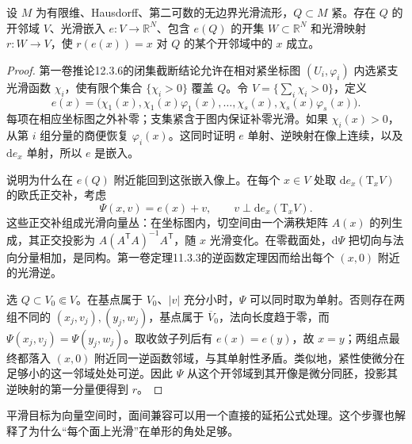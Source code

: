 \begin{lemma}\label{g2:lem:compact-image-retraction}
	设 \(M\) 为有限维、Hausdorff、第二可数的无边界光滑流形，\(Q\subset M\) 紧。存在 \(Q\) 的开邻域 \(V\)、光滑嵌入 \(e:V\to\mathbb R^N\)、包含 \(e(Q)\) 的开集 \(W\subset\mathbb R^N\) 和光滑映射 \(r:W\to V\)，使 \(r(e(x))=x\) 对 \(Q\) 的某个开邻域中的 \(x\) 成立。
\end{lemma}
\begin{proof}
	第一卷推论12.3.6的闭集截断结论允许在相对紧坐标图 \((U_i,\varphi_i)\) 内选紧支光滑函数 \(\chi_i\)，使有限个集合 \(\{\chi_i>0\}\) 覆盖 \(Q\)。令 \(V=\{\sum_i\chi_i>0\}\)，定义
	\[
		e(x)=\bigl(\chi_1(x),\chi_1(x)\varphi_1(x),\ldots,\chi_s(x),\chi_s(x)\varphi_s(x)\bigr).
	\]
	每项在相应坐标图之外补零；支集紧含于图内保证补零光滑。如果 \(\chi_i(x)>0\)，从第 \(i\) 组分量的商便恢复 \(\varphi_i(x)\)。这同时证明 \(e\) 单射、逆映射在像上连续，以及 \(\mathrm{d}e_x\) 单射，所以 \(e\) 是嵌入。

	说明为什么在 \(e(Q)\) 附近能回到这张嵌入像上。在每个 \(x\in V\) 处取 \(\mathrm{d}e_x(\mathrm{T}_xV)\) 的欧氏正交补，考虑
	\[
		\Psi(x,v)=e(x)+v,\qquad v\perp\mathrm{d}e_x(\mathrm{T}_xV).
	\]
	这些正交补组成光滑向量丛：在坐标图内，切空间由一个满秩矩阵 \(A(x)\) 的列生成，其正交投影为 \(A(A^{\mathsf T}A)^{-1}A^{\mathsf T}\)，随 \(x\) 光滑变化。在零截面处，\(\mathrm{d}\Psi\) 把切向与法向分量相加，是同构。第一卷定理11.3.3的逆函数定理因而给出每个 \((x,0)\) 附近的光滑逆。

	选 \(Q\subset V_0\Subset V\)。在基点属于 \(V_0\)、\(|v|\) 充分小时，\(\Psi\) 可以同时取为单射。否则存在两组不同的 \((x_j,v_j),(y_j,w_j)\)，基点属于 \(\overline V_0\)，法向长度趋于零，而 \(\Psi(x_j,v_j)=\Psi(y_j,w_j)\)。取收敛子列后有 \(e(x)=e(y)\)，故 \(x=y\)；两组点最终都落入 \((x,0)\) 附近同一逆函数邻域，与其单射性矛盾。类似地，紧性使微分在足够小的这一邻域处处可逆。因此 \(\Psi\) 从这个开邻域到其开像是微分同胚，投影其逆映射的第一分量便得到 \(r\)。
\end{proof}

平滑目标为向量空间时，面间兼容可以用一个直接的延拓公式处理。这个步骤也解释了为什么“每个面上光滑”在单形的角处足够。

